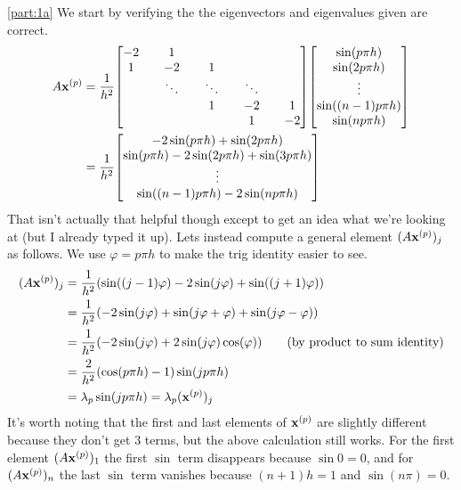\documentclass[boxes,pages]{homework}
\begin{document}
\begin{solution}
	\ref{part:1a}
	We start by verifying the the eigenvectors and eigenvalues given are correct.
	\begin{align*}
		A\vb{x}^{(p)} &= \frac{1}{h^2}\mqty[-2 && 1 && && && \\ 1 && -2 && 1 && && \\ && \ddots && \ddots && \ddots && \\ && && 1 && -2&&1\\ && && && 1&& -2]\mqty[\sin(p\pi h) \\ \sin(2p\pi h) \\ \vdots \\ \sin((n - 1)p\pi h) \\ \sin(np\pi h)] \\
		&= \frac{1}{h^2}\mqty[-2\sin(p\pi h) + \sin(2p\pi h) \\ \sin(p\pi h) - 2\sin(2p\pi h) + \sin(3p\pi h) \\ \vdots \\ \sin((n-1)p\pi h) - 2\sin(np\pi h)]
	\end{align*}
	That isn't actually that helpful though except to get an idea what we're looking at (but I already typed it up). Lets instead compute a general element $(A\vb{x}^{(p)})_j$ as follows. We use $\varphi = p\pi h$ to make the trig identity easier to see.
	\begin{align*}
		(A\vb{x}^{(p)})_j & = \frac{1}{h^2}\qty(\sin((j - 1)\varphi) - 2\sin(j\varphi) + \sin((j + 1)\varphi))                    \\
		                  & = \frac{1}{h^2}\qty(-2\sin(j\varphi) + \sin(j\varphi + \varphi) + \sin(j\varphi - \varphi))           \\
		                  & = \frac{1}{h^2}\qty(-2\sin(j\varphi) + 2\sin(j\varphi)\cos(\varphi)) \tag{by product to sum identity} \\
		                  & = \frac{2}{h^2}\qty(\cos(p\pi h) - 1)\sin(jp\pi h)                                                    \\
		                  & = \lambda_p\sin(jp\pi h) = \lambda_p(\vb{x}^{(p)})_j
	\end{align*}
	It's worth noting that the first and last elements of $\vb{x}^{(p)}$ are slightly different because they don't get 3 terms, but the above calculation still works. For the first element $(A\vb{x}^{(p)})_1$ the first $\sin$ term disappears because $\sin 0 = 0$, and for $(A\vb{x}^{(p)})_n$ the last $\sin$ term vanishes because $(n+1)h = 1$ and $\sin(n\pi) = 0$.


\end{solution}
\end{document}
